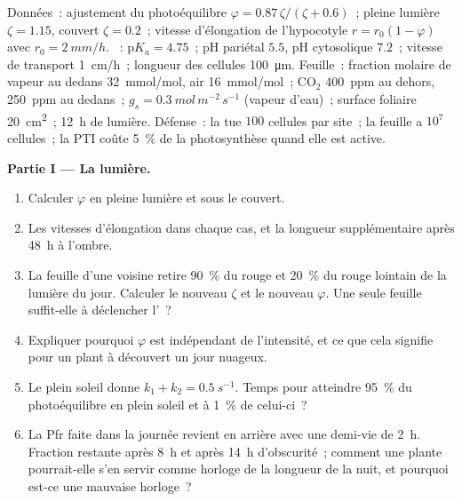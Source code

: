\begin{problem}
\label{pb:b3:plant-molecular-physiology:1}
Données~: ajustement du photoéquilibre $\varphi = 0.87\,\zeta/(\zeta + 0.6)$~;
pleine lumière $\zeta = 1.15$, couvert $\zeta = 0.2$~; vitesse
d'élongation de l'hypocotyle $r = r_{0}(1 - \varphi)$ avec $r_{0} = \qty{2}{mm/h}$.
~: $\mathrm{p}K_{a} = 4.75$~; pH pariétal $5.5$, pH cytosolique
$7.2$~; vitesse de transport \qty{1}{cm/h}~; longueur des cellules
\qty{100}{\micro m}. Feuille~: fraction molaire de vapeur au dedans
\qty{32}{mmol/mol}, air \qty{16}{mmol/mol}~; CO$_{2}$ \qty{400}{ppm} au
dehors, \qty{250}{ppm} au dedans~; $g_{s} =
\qty{0.3}{mol\,m^{-2}\,s^{-1}}$ (vapeur d'eau)~; surface foliaire
\qty{20}{cm^2}~; \qty{12}{h} de lumière. Défense~: la  tue $100$ cellules par site~; la feuille a $10^{7}$
cellules~; la PTI coûte \qty{5}{\%} de la photosynthèse quand elle est
active.

\medskip
\noindent\textbf{Partie I --- La lumière.}
\begin{enumerate}
  \item Calculer $\varphi$ en pleine lumière et sous le couvert.
  \item Les vitesses d'élongation dans chaque cas, et la longueur
        supplémentaire après \qty{48}{h} à l'ombre.
  \item La feuille d'une voisine retire \qty{90}{\%} du rouge et
        \qty{20}{\%} du rouge lointain de la lumière du jour. Calculer le
        nouveau $\zeta$ et le nouveau $\varphi$. Une seule feuille
        suffit-elle à déclencher l'~?
  \item Expliquer pourquoi $\varphi$ est indépendant de l'intensité, et
        ce que cela signifie pour un plant à découvert un jour nuageux.
  \item Le plein soleil donne $k_{1} + k_{2} = \qty{0.5}{s^{-1}}$. Temps
        pour atteindre \qty{95}{\%} du photoéquilibre en plein soleil et
        à \qty{1}{\%} de celui-ci~?
  \item La Pfr faite dans la journée revient en arrière avec une demi-vie
        de \qty{2}{h}. Fraction restante après \qty{8}{h} et après
        \qty{14}{h} d'obscurité~; comment une plante pourrait-elle s'en
        servir comme horloge de la longueur de la nuit, et pourquoi
        est-ce une mauvaise horloge~?
\end{enumerate}


\end{problem}
